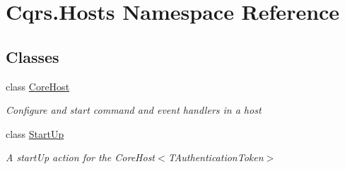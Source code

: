 \hypertarget{namespaceCqrs_1_1Hosts}{}\section{Cqrs.\+Hosts Namespace Reference}
\label{namespaceCqrs_1_1Hosts}
\subsection*{Classes}
\begin{DoxyCompactItemize}
\item 
class \hyperlink{classCqrs_1_1Hosts_1_1CoreHost}{Core\+Host}
\begin{DoxyCompactList}\small\item\em Configure and start command and event handlers in a host \end{DoxyCompactList}\item 
class \hyperlink{classCqrs_1_1Hosts_1_1StartUp}{Start\+Up}
\begin{DoxyCompactList}\small\item\em A start\+Up action for the Core\+Host$<$\+T\+Authentication\+Token$>$ \end{DoxyCompactList}\end{DoxyCompactItemize}
